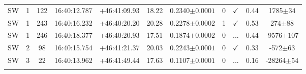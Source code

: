 \begin{landscape}
\begin{longtable}{ccccccccccc}
	SW & 1 & 122 & 16:40:12.787 & +46:41:09.93 & 18.22 & 0.2340$\pm{0.0001}$ & 0 & $\checkmark$ & 0.44 & 1785$\pm{34}$ \\
	SW & 1 & 243 & 16:40:16.232 & +46:40:20.20 & 20.28 & 0.2278$\pm{0.0002}$ & 1 & $\checkmark$ & 0.53 & 274$\pm{88}$ \\
	SW & 1 & 246 & 16:40:18.377 & +46:40:20.93 & 17.51 & 0.1874$\pm{0.0002}$ & 0 & ... & 0.44 & -9576$\pm{107}$ \\
	SW & 2 & 98 & 16:40:15.754 & +46:41:21.37 & 20.03 & 0.2243$\pm{0.0001}$ & 0 & $\checkmark$ & 0.33 & -572$\pm{63}$ \\
	SW & 3 & 22 & 16:40:13.962 & +46:41:49.44 & 17.63 & 0.1107$\pm{0.0001}$ & 0 & ... & 0.16 & -28264$\pm{54}$ \\
	\hline
	\label{2tbl:MSJ164019.8+464241.5}
	\end{longtable}
\end{landscape}


